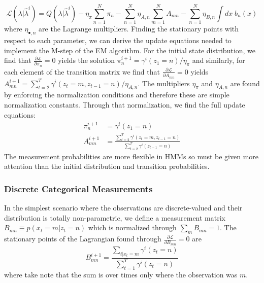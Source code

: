 \documentclass[onecolumn]{gwclass}
\begin{document}
	$$ \mathscr{L}(\lambda|\hat\lambda^i) = Q(\lambda|\hat\lambda^i) - \eta_\pi\sum_{n=1}^N \pi_n - \sum_{n=1}^N \eta_{A,n} \sum_{m=1}^N A_{mn} - \sum_{n=1}^N \eta_{B,n} \int dx\;b_n(x) $$
	where $\eta_{\bullet,n}$ are the Lagrange multipliers. Finding the stationary points with respect to each parameter, we can derive the update equations needed to implement the M-step of the EM algorithm. For the initial state distribution, we find that $\frac{\partial\mathscr{L}}{\partial \pi_n}=0$ yields the solution $\pi_n^{i+1}=\gamma^i(z_1=n)/\eta_\pi$ and similarly, for each element of the transition matrix we find that $\frac{\partial\mathscr{L}}{\partial A_{mn}}=0$ yields $A_{mn}^{i+1}=\sum_{t=2}^T \gamma^i(z_t=m,z_{t-1}=n)/\eta_{A,n}$. The multipliers $\eta_\pi$ and $\eta_{A,n}$ are found by enforcing the normalization conditions and therefore these are simple normalization constants. Through that normalization, we find the full update equations:
	\begin{align*}
		\pi_n^{i+1} &= \gamma^i(z_1=n) \\
		A_{mn}^{i+1} &= \frac{\sum_{t=2}^T \gamma^i(z_t=m,z_{t-1}=n) }{\sum_{t=2}^T\gamma^i(z_{t-1}=n)}
	\end{align*}
	The measurement probabilities are more flexible in HMMs so must be given more attention than the initial distribution and transition probabilities. 
	\subsubsection{Discrete Categorical Measurements}
	In the simplest scenario where the observations are discrete-valued and their distribution is totally non-parametric, we define a measurement matrix $B_{mn}\equiv p(x_t=m|z_t=n)$ which is normalized through $\sum_m B_{mn}=1$. The stationary points of the Lagrangian found through $\frac{\partial \mathscr{L}}{\partial B_{mn}}=0$ are
	$$B_{mn}^{i+1} = \frac{\sum_{t|x_t=m}\gamma^i(z_t=n)}{\sum_{t=1}^T\gamma^i(z_t=n)}$$
	where take note that the sum is over times only where the observation was $m$. 
\end{document}

